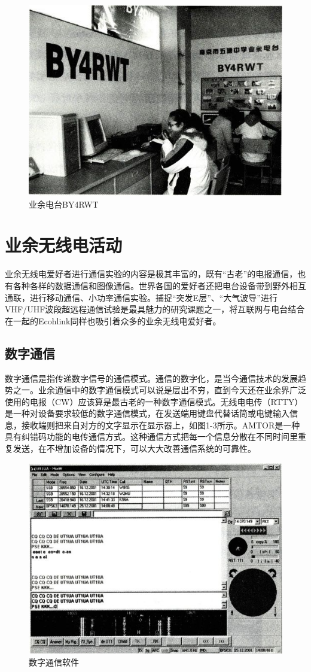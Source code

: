 \documentclass[12pt,UTF8]{ctexbook}
\begin{document}
\begin{figure}[htbp]
	\centering
	\includegraphics[width=0.7\linewidth]{2}
	\caption{业余电台BY4RWT}
	\label{fig:1}
\end{figure}

\section{业余无线电活动}

业余无线电爱好者进行通信实验的内容是极其丰富的，既有“古老”的电报通信，也有各种各样的数据通信和图像通信。世界各国的爱好者还把电台设备带到野外相互通联，进行移动通信、小功率通信实验。捕捉“突发E层”、“大气波导”进行VHF/UHF波段超远程通信试验是最具魅力的研究课题之一，将互联网与电台结合在一起的Ecohlink同样也吸引着众多的业余无线电爱好者。

\subsection{数字通信}

数字通信是指传递数字信号的通信模式。通信的数字化，是当今通信技术的发展趋势之一。业余通信中的数字通信模式可以说是层出不穷，直到今天还在业余界广泛使用的电报（CW）应该算是最古老的一种数字通信模式。无线电电传（RTTY）是一种对设备要求较低的数字通信模式，在发送端用键盘代替话筒或电键输入信息，接收端则把来自对方的文字显示在显示器上，如图1-3所示。AMTOR是一种具有纠错码功能的电传通信方式。这种通信方式把每一个信息分散在不同时间里重复发送，在不增加设备的情况下，可以大大改善通信系统的可靠性。

\begin{figure}[htbp]
	\centering
	\includegraphics[width=0.7\linewidth]{3}
	\caption{数字通信软件}
	\label{fig:1}
\end{figure}
\end{document}
